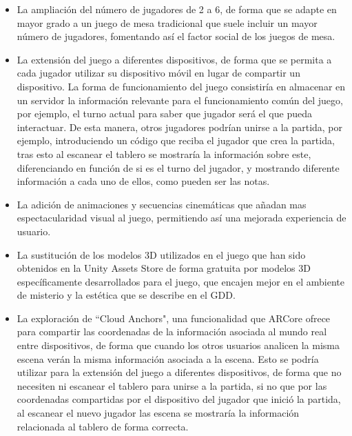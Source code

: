 \begin{itemize}
  \item La ampliación del número de jugadores de 2 a 6, de forma que se adapte en mayor grado a un juego de mesa tradicional que suele incluir un mayor número de jugadores, fomentando así el factor social de los juegos de mesa.

  \item La extensión del juego a diferentes dispositivos, de forma que se permita a cada jugador utilizar su dispositivo móvil en lugar de compartir un dispositivo. La forma de funcionamiento del juego consistiría en almacenar en un servidor la información relevante para el funcionamiento común del juego, por ejemplo, el turno actual para saber que jugador será el que pueda interactuar. De esta manera, otros jugadores podrían unirse a la partida, por ejemplo, introduciendo un código que reciba el jugador que crea la partida, tras esto al escanear el tablero se mostraría la información sobre este, diferenciando en función de si es el turno del jugador, y mostrando diferente información a cada uno de ellos, como pueden ser las notas.

  \item La adición de animaciones y secuencias cinemáticas que añadan mas espectacularidad visual al juego, permitiendo así una mejorada experiencia de usuario.

  \item La sustitución de los modelos 3D utilizados en el juego que han sido obtenidos en la Unity Assets Store de forma gratuita por modelos 3D específicamente desarrollados para el juego, que encajen mejor en el ambiente de misterio y la estética que se describe en el GDD.

  \item La exploración de ``Cloud Anchors", una funcionalidad que ARCore ofrece para compartir las coordenadas de la información asociada al mundo real entre dispositivos, de forma que cuando los otros usuarios analicen la misma escena verán la misma información asociada a la escena. Esto se podría utilizar para la extensión del juego a diferentes dispositivos, de forma que no necesiten ni escanear el tablero para unirse a la partida, si no que por las coordenadas compartidas por el dispositivo del jugador que inició la partida, al escanear el nuevo jugador las escena se mostraría la información relacionada al tablero de forma correcta.

\end{itemize}
